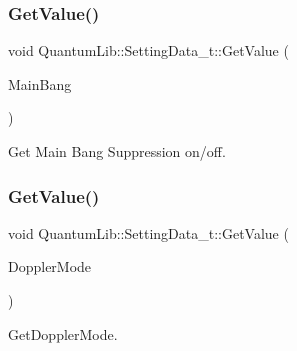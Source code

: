 \subsubsection{\texorpdfstring{Get\+Value()}{GetValue()}\hspace{0.1cm}{\footnotesize\ttfamily [19/26]}}
{\footnotesize\ttfamily void Quantum\+Lib\+::\+Setting\+Data\+\_\+t\+::\+Get\+Value (\begin{DoxyParamCaption}\item[{\mbox{\hyperlink{namespace_quantum_lib_af78fc1282ff8d85de46fff58a89f5798}{e\+Main\+Bang\+\_\+t}} \&}]{Main\+Bang }\end{DoxyParamCaption})\hspace{0.3cm}{\ttfamily [inline]}}



Get Main Bang Suppression on/off. 

\mbox{\label{struct_quantum_lib_1_1_setting_data__t_a40d5020934023e7f8f9734390b37d5b4}} 
\subsubsection{\texorpdfstring{Get\+Value()}{GetValue()}\hspace{0.1cm}{\footnotesize\ttfamily [20/26]}}
{\footnotesize\ttfamily void Quantum\+Lib\+::\+Setting\+Data\+\_\+t\+::\+Get\+Value (\begin{DoxyParamCaption}\item[{\mbox{\hyperlink{namespace_quantum_lib_a67a865bb9894671b27595a61dfcd44b5}{e\+Doppler\+Mode\+\_\+t}} \&}]{Doppler\+Mode }\end{DoxyParamCaption})\hspace{0.3cm}{\ttfamily [inline]}}



Get\+Doppler\+Mode. 

\mbox{\label{struct_quantum_lib_1_1_setting_data__t_ae20b64e4c5d1cc5696f09ba8eedc3eaa}} 
